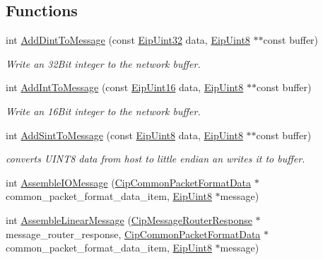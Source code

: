 \subsection*{\-Functions}
\begin{DoxyCompactItemize}
\item 
int \hyperlink{group__ENCAP_gaafc3c9e3ff582c9b7e438ae2b1fdf822}{\-Add\-Dint\-To\-Message} (const \hyperlink{typedefs_8h_abf2dd49262551294eb990ef8746a2767}{\-Eip\-Uint32} data, \hyperlink{typedefs_8h_aa0c108ee762a27720919a4634643040e}{\-Eip\-Uint8} $\ast$$\ast$const buffer)
\begin{DoxyCompactList}\small\item\em \-Write an 32\-Bit integer to the network buffer. \end{DoxyCompactList}\item 
int \hyperlink{group__ENCAP_gae689aac2a85bf49fb356ec94c8800799}{\-Add\-Int\-To\-Message} (const \hyperlink{typedefs_8h_ac1b4cfa25b4f5def62f23b455dd395d8}{\-Eip\-Uint16} data, \hyperlink{typedefs_8h_aa0c108ee762a27720919a4634643040e}{\-Eip\-Uint8} $\ast$$\ast$const buffer)
\begin{DoxyCompactList}\small\item\em \-Write an 16\-Bit integer to the network buffer. \end{DoxyCompactList}\item 
int \hyperlink{group__ENCAP_gae267a8684cc6ee1b3bd83df03260b7aa}{\-Add\-Sint\-To\-Message} (const \hyperlink{typedefs_8h_aa0c108ee762a27720919a4634643040e}{\-Eip\-Uint8} data, \hyperlink{typedefs_8h_aa0c108ee762a27720919a4634643040e}{\-Eip\-Uint8} $\ast$$\ast$const buffer)
\begin{DoxyCompactList}\small\item\em converts \-U\-I\-N\-T8 data from host to little endian an writes it to buffer. \end{DoxyCompactList}\item 
int \hyperlink{group__ENCAP_gad61fa4f84989cf27086d57557ad552c4}{\-Assemble\-I\-O\-Message} (\hyperlink{structCipCommonPacketFormatData}{\-Cip\-Common\-Packet\-Format\-Data} $\ast$common\-\_\-packet\-\_\-format\-\_\-data\-\_\-item, \hyperlink{typedefs_8h_aa0c108ee762a27720919a4634643040e}{\-Eip\-Uint8} $\ast$message)
\item 
int \hyperlink{group__ENCAP_gaa81c027561d86d2589b8002b36b88392}{\-Assemble\-Linear\-Message} (\hyperlink{structCipMessageRouterResponse}{\-Cip\-Message\-Router\-Response} $\ast$message\-\_\-router\-\_\-response, \hyperlink{structCipCommonPacketFormatData}{\-Cip\-Common\-Packet\-Format\-Data} $\ast$common\-\_\-packet\-\_\-format\-\_\-data\-\_\-item, \hyperlink{typedefs_8h_aa0c108ee762a27720919a4634643040e}{\-Eip\-Uint8} $\ast$message)
$$
\end{DoxyCompactItemize}
